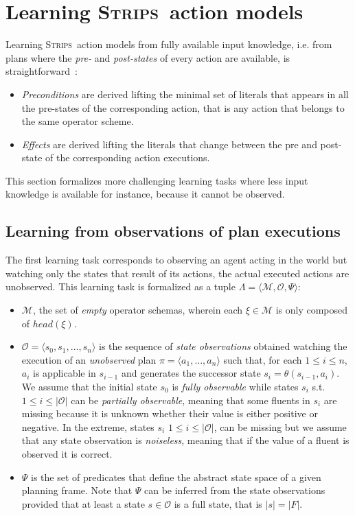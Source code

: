 \documentclass[3p,times]{elsarticle}
\newcommand{\strips}{\textsc{Strips}}     %
\newcommand{\tup}[1]{{\langle #1 \rangle}}
\begin{document}
\section{Learning \strips\ action models}
\label{sec:Section4}
Learning \strips\ action models from fully available input knowledge, i.e. from plans where the {\em pre-} and {\em post-states} of every action are available, is straightforward~\cite{jimenez2012review}:
\begin{itemize}
  \item {\em Preconditions} are derived lifting the minimal set of literals that appears in all the pre-states of the corresponding action, that is any action that belongs to the same operator scheme.
  \item {\em Effects} are derived lifting the literals that change between the pre and post-state of the corresponding action executions.
\end{itemize}
This section formalizes more challenging learning tasks where less input knowledge is available for instance, because it cannot be observed.

\subsection{Learning from observations of plan executions}
The first learning task corresponds to observing an agent acting in the world but watching only the states that result of its actions, the actual executed actions are unobserved. This learning task is formalized as a tuple $\Lambda=\tup{\mathcal{M},\mathcal{O},\Psi}$:
\begin{itemize}
\item $\mathcal{M}$, the set of {\em empty} operator schemas, wherein each $\xi\in\mathcal{M}$ is only composed of $head(\xi)$.
\item $\mathcal{O}=\tup{s_0,s_1,\ldots,s_{n}}$ is the sequence of {\em state observations} obtained watching the execution of an {\em unobserved} plan $\pi=\tup{a_1, \ldots, a_n}$ such that, for each {\small $1\leq i\leq n$}, $a_i$ is applicable in $s_{i-1}$ and generates the successor state $s_i=\theta(s_{i-1},a_i)$. We assume that the initial state $s_0$ is {\em fully observable} while states $s_i$ s.t. {\small $1\leq i\leq |\mathcal{O}|$} can be {\em partially observable}, meaning that some fluents in $s_i$ are missing because it is unknown whether their value is either positive or negative. In the extreme, states $s_i$ {\small $1\leq i\leq |\mathcal{O}|$}, can be missing but we assume that any state observation is {\em noiseless}, meaning that if the value of a fluent is observed it is correct.
\item $\Psi$ is the set of predicates that define the abstract state space of a given planning frame. Note that $\Psi$ can be inferred from the state observations provided that at least a state $s\in \mathcal{O}$ is a full state, that is $|s|=|F|$.
\end{itemize}
\end{document}
